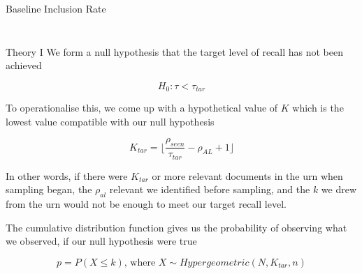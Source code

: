 \documentclass[9pt,aspectratio=169]{beamer}
\begin{document}
\begin{frame}{Baseline Inclusion Rate}
\begin{columns}
\begin{column}{0.382\linewidth}
\begin{figure}
		\end{figure}
	\end{column}
\end{columns}

\end{frame}

\begin{frame}{Theory I}
We form a null hypothesis that the target level of recall has not been achieved

\begin{equation}
H_0 : \tau < \tau_{tar}
\end{equation}

To operationalise this, we come up with a hypothetical value of $K$ which is the lowest value compatible with our null hypothesis

\begin{equation}
K_{tar} = \lfloor \frac{\rho_{seen}}{\tau_{tar}}-\rho_{AL}+1 \rfloor
\end{equation}

In other words, if there were $K_{tar}$ or more relevant documents in the urn when sampling began, the $\rho_{al}$ relevant we identified before sampling, and the $k$ we drew from the urn would not be enough to meet our target recall level.

\medskip 

The cumulative distribution function gives us the probability of observing what we observed, if our null hypothesis were true

\begin{equation}
p = P(X \leq k) \text{, where } X \sim Hypergeometric(N,K_{tar},n)
\label{eq:p-value}
\end{equation}

\end{frame}
\end{document}
